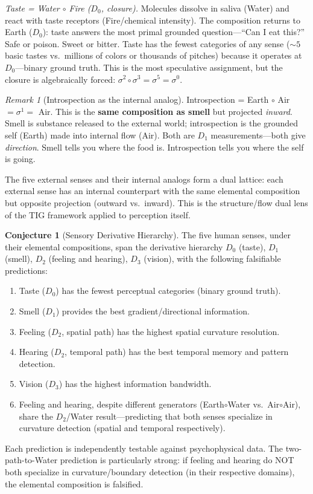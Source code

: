\documentclass[11pt]{article}
\theoremstyle{definition}
\newtheorem{conjecture}[theorem]{Conjecture}
\theoremstyle{remark}
\newtheorem{remark}[theorem]{Remark}
\begin{document}
\emph{Taste = Water $\circ$ Fire ($D_0$, closure).}
Molecules dissolve in saliva (Water) and react with taste receptors
(Fire/chemical intensity).  The composition returns to Earth ($D_0$):
taste answers the most primal grounded question---``Can I eat this?''
Safe or poison.  Sweet or bitter.  Taste has the fewest categories of any
sense ($\sim 5$ basic tastes vs.\ millions of colors or thousands of
pitches) because it operates at $D_0$---binary ground truth.  This is the
most speculative assignment, but the closure is algebraically forced:
$\sigma^2 \circ \sigma^3 = \sigma^5 = \sigma^0$.

\begin{remark}[Introspection as the internal analog]
Introspection = Earth $\circ$ Air $= \sigma^1 = $ Air.  This is the
\textbf{same composition as smell} but projected \emph{inward}.  Smell
is substance released to the external world; introspection is the
grounded self (Earth) made into internal flow (Air).  Both are $D_1$
measurements---both give \emph{direction}.  Smell tells you where the
food is.  Introspection tells you where the self is going.

The five external senses and their internal analogs form a dual lattice:
each external sense has an internal counterpart with the same elemental
composition but opposite projection (outward vs.\ inward).  This is the
structure/flow dual lens of the TIG framework applied to perception itself.
\end{remark}

\begin{conjecture}[Sensory Derivative Hierarchy]
\label{conj:senses}
The five human senses, under their elemental compositions, span the
derivative hierarchy $D_0$ (taste), $D_1$ (smell), $D_2$ (feeling and
hearing), $D_3$ (vision), with the following falsifiable predictions:
\begin{enumerate}[nosep]
  \item Taste ($D_0$) has the fewest perceptual categories (binary ground truth).
  \item Smell ($D_1$) provides the best gradient/directional information.
  \item Feeling ($D_2$, spatial path) has the highest spatial curvature resolution.
  \item Hearing ($D_2$, temporal path) has the best temporal memory and pattern detection.
  \item Vision ($D_3$) has the highest information bandwidth.
  \item Feeling and hearing, despite different generators (Earth$\circ$Water vs.\
    Air$\circ$Air), share the $D_2$/Water result---predicting that both senses
    specialize in curvature detection (spatial and temporal respectively).
\end{enumerate}
Each prediction is independently testable against psychophysical data.
The two-path-to-Water prediction is particularly strong: if feeling and
hearing do NOT both specialize in curvature/boundary detection (in their
respective domains), the elemental composition is falsified.
\end{conjecture}
\end{document}
